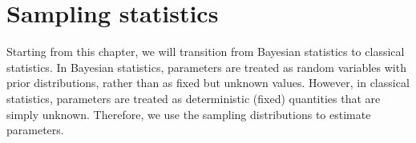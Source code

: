 \chapter{Sampling statistics}

Starting from this chapter, we will transition from Bayesian statistics to classical statistics. In Bayesian statistics, parameters are treated as random variables with prior distributions, rather than as fixed but unknown values. However, in classical statistics, parameters are treated as deterministic (fixed) quantities that are simply unknown. Therefore, we use the sampling distributions to estimate parameters. 

